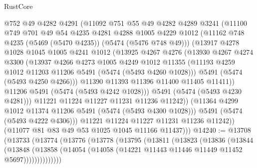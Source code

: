 \begin{lexlean}{RustCore}
\begin{coremodule}
                @752
                @49
                @4282
                @4291
                (@11092
                  @751
                  @55
                  @49
                  @4282
                  @4289
                  @3241
                  (@11100
                    @749
                    @701
                    @49
                    @54
                    @4235
                    @4281
                    @4288
                    @1005
                    @4229
                    @1012
                    (@11162 @748 @4235 (@5469 (@5470 @4235)) (@5474 (@5476 @748 @49)))
                    (@13917
                      @4278
                      @1028
                      @1045
                      @1005
                      @4241
                      @1012
                      (@13925
                        @4267
                        @4276
                        (@13930
                          @4267
                          @4274
                          @3300
                          (@13937
                            @4266
                            @4273
                            @1005
                            @4249
                            @1012
                            @11355
                            (@11193 @4259 @1012 @11203 @11206 @5491 (@5474 (@5493 @4260 @1028)))
                            @5491
                            (@5474 (@5493 @4250 @4266)))
                          @11390
                          @11393
                          @11396
                          @11400
                          @11405
                          @11411))
                      @11206
                      @5491
                      (@5474 (@5493 @4242 @1028)))
                    @5491
                    (@5474 (@5493 @4230 @4281)))
                  @11221
                  @11224
                  @11227
                  @11231
                  @11236
                  @11242))
              (@11364 @4299 @1012 @11374 @11206 @5491 (@5474 (@5493 @4300 @1028)))
              @5491
              (@5474 (@5493 @4222 @4306)))
            @11221
            @11224
            @11227
            @11231
            @11236
            @11242))
        (@11077 @81 @83 @49 @53 @1025 @1045 @11166 @11437)))
@14240 := @13708
    (@13733
      (@13774
        (@13776
          (@13778
            (@13795
              (@13811
                (@13823
                  (@13836
                    (@13844
                      (@13848
                        (@13858
                          (@14054 (@14058 (@14221 @11443 @11446 @11449 @11452 @5697))))))))))))))

\end{coremodule}
\end{lexlean}
